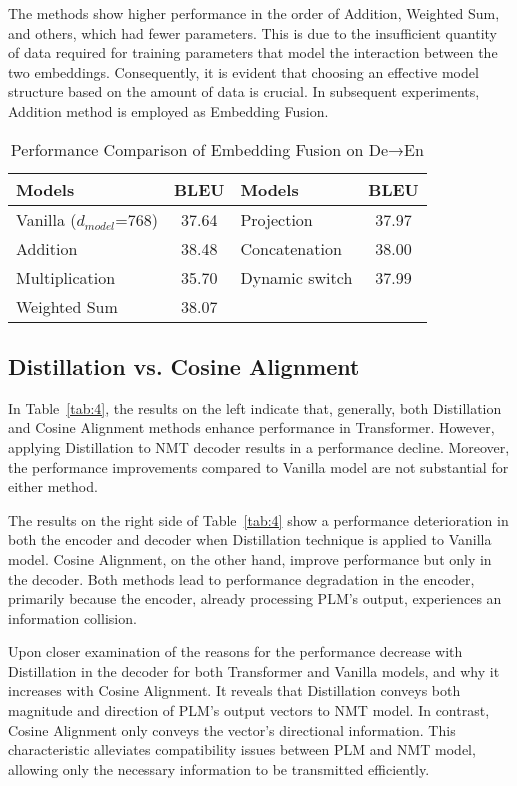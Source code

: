 \documentclass[conference]{IEEEtran}
\begin{document}
The methods show higher performance in the order of Addition, Weighted Sum, and others, which had fewer parameters. This is due to the insufficient quantity of data required for training parameters that model the interaction between the two embeddings. Consequently, it is evident that choosing an effective model structure based on the amount of data is crucial. In subsequent experiments, Addition method is employed as Embedding Fusion.
\begin{table}[!tb]
    \centering
    \caption{Performance Comparison of Embedding Fusion on De→En}
    \label{tab:3}
    \begin{tabular}{|l|c|l|c|}
        \hline
        \textbf{Models} & \textbf{BLEU} & \textbf{Models} & \textbf{BLEU} \\
        \hline
        Vanilla ($d_{model}$=768) & 37.64 & Projection & 37.97 \\
        Addition & 38.48 & Concatenation & 38.00 \\
        Multiplication & 35.70 & Dynamic switch & 37.99 \\
        Weighted Sum & 38.07 & & \\
        \hline
    \end{tabular}
\end{table}

\subsection{Distillation vs. Cosine Alignment}
In Table~\ref{tab:4}, the results on the left indicate that, generally, both Distillation and Cosine Alignment methods enhance performance in Transformer. However, applying Distillation to NMT decoder results in a performance decline. Moreover, the performance improvements compared to Vanilla model are not substantial for either method.

The results on the right side of Table~\ref{tab:4} show a performance deterioration in both the encoder and decoder when Distillation technique is applied to Vanilla model. Cosine Alignment, on the other hand, improve performance but only in the decoder. Both methods lead to performance degradation in the encoder, primarily because the encoder, already processing PLM's output, experiences an information collision.

Upon closer examination of the reasons for the performance decrease with Distillation in the decoder for both Transformer and Vanilla models, and why it increases with Cosine Alignment. It reveals that Distillation conveys both magnitude and direction of PLM's output vectors to NMT model. In contrast, Cosine Alignment only conveys the vector's directional information. This characteristic alleviates compatibility issues between PLM and NMT model, allowing only the necessary information to be transmitted efficiently.
\end{document}
